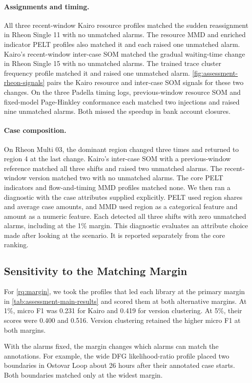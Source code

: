 \paragraph{Assignments and timing.}
All three recent-window Kairo resource profiles matched the sudden reassignment in Rheon Single 11 with no unmatched alarms. The \softwarepm{} resource MMD and enriched indicator PELT profiles also matched it and each raised one unmatched alarm. Kairo's recent-window inter-case SOM matched the gradual waiting-time change in Rheon Single 15 with no unmatched alarms. The trained trace cluster frequency profile matched it and raised one unmatched alarm. \autoref{fig:assessment-rheon-signals} pairs the Kairo resource and inter-case SOM signals for these two changes. On the three Padella timing logs, previous-window resource SOM and fixed-model Page-Hinkley conformance each matched two injections and raised nine unmatched alarms. Both missed the speedup in bank account closures.



\paragraph{Case composition.}
On Rheon Multi 03, the dominant region changed three times and returned to region 4 at the last change. Kairo's inter-case SOM with a previous-window reference matched all three shifts and raised two unmatched alarms. The recent-window version matched two with no unmatched alarms. The core \softwarepm{} PELT indicators and flow-and-timing MMD profiles matched none. We then ran a diagnostic with the case attributes supplied explicitly. PELT used region shares and average case amounts, and MMD used region as a categorical feature and amount as a numeric feature. Each detected all three shifts with zero unmatched alarms, including at the 1\% margin. This diagnostic evaluates an attribute choice made after looking at the scenario. It is reported separately from the core ranking.

\subsection{Sensitivity to the Matching Margin}
\label{sec:assessment-sensitivity}

For \ref*{rq:margin}, we took the profiles that led each library at the primary margin in \autoref{tab:assessment-main-results} and scored them at both alternative margins. At 1\%, micro F1 was 0.231 for Kairo and 0.419 for version clustering. At 5\%, their scores were 0.400 and 0.516. Version clustering retained the higher micro F1 at both margins.

With the alarms fixed, the margin changes which alarms can match the annotations. For example, the wide DFG likelihood-ratio profile placed two boundaries in Ostovar Loop about 26 hours after their annotated case starts. Both boundaries matched only at the widest margin.
